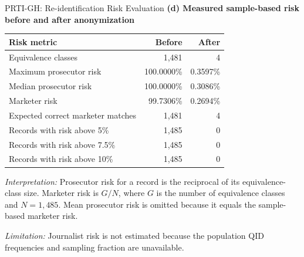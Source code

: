 \documentclass[9pt]{beamer}
\begin{document}
\begin{frame}[t]{PRTI-GH: Re-identification Risk Evaluation}
    \scriptsize
    \centering
    \textbf{(d) Measured sample-based risk before and after anonymization}

    \vspace{0.3cm}
    \renewcommand{\arraystretch}{1.22}
    \setlength{\tabcolsep}{5pt}

    \begin{tabular*}{0.84\textwidth}{@{}@{\extracolsep{\fill}}lrr@{}}
        \toprule
        \textbf{Risk metric} & \textbf{Before} & \textbf{After} \\
        \midrule
        Equivalence classes
            & 1,481 & 4 \\
        Maximum prosecutor risk
            & 100.0000\% & 0.3597\% \\
        Median prosecutor risk
            & 100.0000\% & 0.3086\% \\
        Marketer risk
            & 99.7306\% & 0.2694\% \\
        Expected correct marketer matches
            & 1,481 & 4 \\
        Records with risk above 5\%
            & 1,485 & 0 \\
        Records with risk above 7.5\%
            & 1,485 & 0 \\
        Records with risk above 10\%
            & 1,485 & 0 \\
        \bottomrule
    \end{tabular*}

    \vspace{0.35cm}
    \begin{minipage}{0.94\textwidth}
        \scriptsize
        \textit{Interpretation:} Prosecutor risk for a record is the reciprocal
        of its equivalence-class size. Marketer risk is $G/N$, where $G$ is
        the number of equivalence classes and $N=1{,}485$. Mean prosecutor
        risk is omitted because it equals the sample-based marketer risk.

        \vspace{0.2cm}
        \textit{Limitation:} Journalist risk is not estimated because the
        population QID frequencies and sampling fraction are unavailable.
    \end{minipage}
\end{frame}
\end{document}
